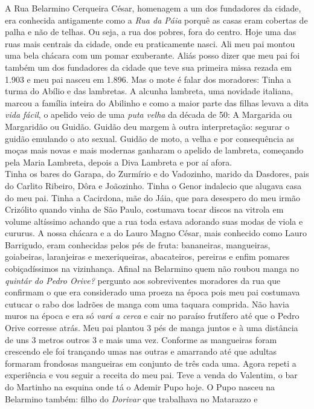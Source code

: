 \documentclass[12pt,brazil,]{book}
\begin{document}
A Rua Belarmino Cerqueira César, homenagem a um dos fundadores da
cidade, era conhecida antigamente como a \emph{Rua da Páia} porquê as
casas eram cobertas de palha e não de telhas. Ou seja, a rua dos pobres,
fora do centro. Hoje uma das ruas mais centrais da cidade, onde eu
praticamente nasci. Ali meu pai montou uma bela chácara com um pomar
exuberante. Aliás posso dizer que meu pai foi também um dos fundadores
da cidade que teve sua primeira missa rezada em 1.903 e meu pai nasceu
em 1.896. Mas o mote é falar dos moradores: Tinha a turma do Abílio e
das lambretas. A alcunha lambreta, uma novidade italiana, marcou a
família inteira do Abilinho e como a maior parte das filhas levava a
dita \emph{vida fácil}, o apelido veio de uma \emph{puta velha} da
década de 50: A Margarida ou Margaridão ou Guidão. Guidão deu margem à
outra interpretação: segurar o guidão emulando o ato sexual. Guidão de
moto, a velha e por consequência as moças mais novas e mais modernas
ganharam o apelido de lambreta, começando pela Maria Lambreta, depois a
Diva Lambreta e por aí afora.\\
Tinha os bares do Garapa, do Zurmírio e do Vadozinho, marido da
Dasdores, pais do Carlito Ribeiro, Dôra e Joãozinho. Tinha o Genor
indalecio que alugava casa do meu pai. Tinha a Cacirdona, mãe do Jáia,
que para desespero do meu irmão Crizólito quando vinha de São Paulo,
costumava tocar discos na vitrola em volume altíssimo achando que a rua
toda estava adorando suas modas de viola e cururus. A nossa chácara e a
do Lauro Magno César, mais conhecido como Lauro Barrigudo, eram
conhecidas pelos pés de fruta: bananeiras, mangueiras, goiabeiras,
laranjeiras e mexeriqueiras, abacateiros, pereiras e enfim pomares
cobiçadíssimos na vizinhança. Afinal na Belarmino quem não roubou manga
no \emph{quintár do Pedro Orive?} pergunto aos sobreviventes moradores
da rua que confirmam o que era considerado uma proeza na época pois meu
pai costumava cutucar o rabo dos ladrões de manga com uma taquara
comprida. Não havia muros na época e era só \emph{vará a cerca} e cair
no paraíso frutífero até que o Pedro Orive corresse atrás. Meu pai
plantou 3 pés de manga juntos e à uma distância de uns 3 metros outros 3
e mais uma vez. Conforme as mangueiras foram crescendo ele foi trançando
umas nas outras e amarrando até que adultas formaram frondosas
mangueiras em conjunto de três cada uma. Agora repeti a experiência e
vou seguir a receita do meu pai. Teve a venda do Valentim, o bar do
Martinho na esquina onde tá o Ademir Pupo hoje. O Pupo nasceu na
Belarmino também: filho do \emph{Dorivar} que trabalhava no Matarazzo e
\end{document}
